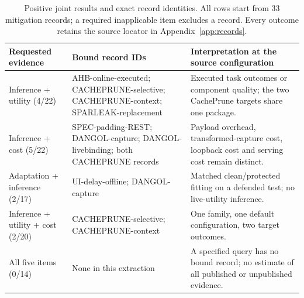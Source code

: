 \begin{table}[t]\centering\footnotesize
\caption{Positive joint results and exact record identities. All rows start from 33 mitigation records; a required inapplicable item excludes a record. Every outcome retains the source locator in Appendix~\ref{app:records}.}\label{tab:r33-positive}
\begin{tabularx}{\textwidth}{@{}p{}p{}Y@{}}\toprule
Requested evidence & Bound record IDs & Interpretation at the source configuration\\\midrule
Inference + utility (4/22) & AHB-online-executed; CACHEPRUNE-selective; CACHEPRUNE-context; SPARLEAK-replacement & Executed task outcomes or component quality; the two CachePrune targets share one package.\\
Inference + cost (5/22) & SPEC-padding-REST; DANGOL-capture; DANGOL-livebinding; both CACHEPRUNE records & Payload overhead, transformed-capture cost, loopback cost and serving cost remain distinct.\\
Adaptation + inference (2/17) & UI-delay-offline; DANGOL-capture & Matched clean/protected fitting on a defended test; no live-utility inference.\\
Inference + utility + cost (2/20) & CACHEPRUNE-selective; CACHEPRUNE-context & One family, one default configuration, two target outcomes.\\
All five items (0/14) & None in this extraction & A specified query has no bound record; no estimate of all published or unpublished evidence.\\
\bottomrule\end{tabularx}\end{table}
